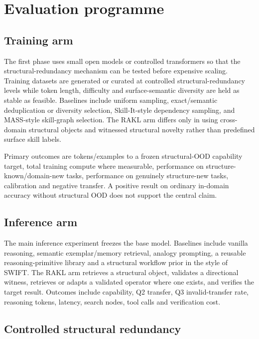 \section{Evaluation programme}

\subsection{Training arm}

The first phase uses small open models or controlled transformers so that the structural-redundancy mechanism can be tested before expensive scaling. Training datasets are generated or curated at controlled structural-redundancy levels while token length, difficulty and surface-semantic diversity are held as stable as feasible. Baselines include uniform sampling, exact/semantic deduplication or diversity selection, Skill-It-style dependency sampling, and MASS-style skill-graph selection. The RAKL arm differs only in using cross-domain structural objects and witnessed structural novelty rather than predefined surface skill labels.

Primary outcomes are tokens/examples to a frozen structural-OOD capability target, total training compute where measurable, performance on structure-known/domain-new tasks, performance on genuinely structure-new tasks, calibration and negative transfer. A positive result on ordinary in-domain accuracy without structural OOD does not support the central claim.

\subsection{Inference arm}

The main inference experiment freezes the base model. Baselines include vanilla reasoning, semantic exemplar/memory retrieval, analogy prompting, a reusable reasoning-primitive library and a structural workflow prior in the style of SWIFT. The RAKL arm retrieves a structural object, validates a directional witness, retrieves or adapts a validated operator where one exists, and verifies the target result. Outcomes include capability, Q2 transfer, Q3 invalid-transfer rate, reasoning tokens, latency, search nodes, tool calls and verification cost.

\subsection{Controlled structural redundancy}

